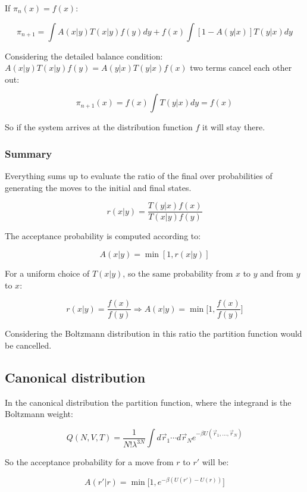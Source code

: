 		If $\pi_n(x) = f(x)$:

		$$\pi_{n+1} = \int A(x|y)T(x|y)f(y)dy + f(x)\int[1-A(y|x)]T(y|x)dy$$

		Considering the detailed balance condition: $A(x|y)T(x|y)f(y) = A(y|x)T(y|x)f(x)$ two terms cancel each other out:

		$$\pi_{n+1}(x) = f(x)\int T(y|x)dy = f(x)$$

		So if the system arrives at the distribution function $f$ it will stay there.

		\subsubsection{Summary}
		Everything sums up to evaluate the ratio of the final over probabilities of generating the moves to the initial and final states.

		$$r(x|y) = \frac{T(y|x)f(x)}{T(x|y)f(y)}$$

		The acceptance probability is computed according to:

		$$A(x|y) = \min[1, r(x|y)]$$

		For a uniform choice of $T(x|y)$, so the same probability from $x$ to $y$ and from $y$ to $x$:

		$$r(x|y) = \frac{f(x)}{f(y)}\Rightarrow A(x|y) = \min\biggl[1, \frac{f(x)}{f(y)}\biggr]$$

		Considering the Boltzmann distribution in this ratio the partition function would be cancelled.

	\subsection{Canonical distribution}
	In the canonical distribution the partition function, where the integrand is the Boltzmann weight:

	$$Q(N, V, T) = \frac{1}{N!\lambda^{3N}}\int d\vec{r}_1\cdots d\vec{r}_Ne^{-\beta U(\vec{r}_1, \dots, \vec{r}_N)}$$

	So the acceptance probability for a move from $r$ to $r'$ will be:

	$$A(r'|r) = \min\bigl[1, e^{-\beta(U(r')-U(r))}\bigr]$$

